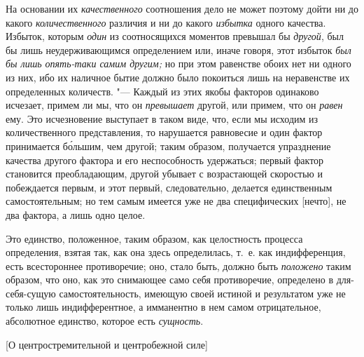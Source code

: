 На основании их {\em качественного} соотношения дело не может поэтому дойти ни
до какого {\em количественного} различия и ни до какого {\em избытка} одного
качества. Избыток, которым {\em один} из соотносящихся моментов превышал бы
{\em другой}, был бы лишь неудерживающимся определением или, иначе говоря, этот
избыток {\em был бы лишь опять-таки самим другим;} но при этом равенстве обоих
нет ни одного из них, ибо их наличное бытие должно было покоиться лишь на
неравенстве их определенных количеств. "--- Каждый из этих якобы факторов
одинаково исчезает, примем ли мы, что он {\em превышает} другой, или примем,
что он {\em равен} ему. Это исчезновение выступает в таком виде, что, если мы
исходим из количественного представления, то нарушается равновесие и один
фактор принимается б\'{о}льшим, чем другой; таким образом, получается
упразднение качества другого фактора и его неспособность удержаться; первый
фактор становится преобладающим, другой убывает с возрастающей скоростью и
побеждается первым, и этот первый, следовательно, делается единственным
самостоятельным; но тем самым имеется уже не два специфических [нечто], не два
фактора, а лишь одно целое.

Это единство, положенное, таким образом, как целостность процесса определения,
взятая так, как она здесь определилась, т.~е. как индифференция, есть
всестороннее противоречие; оно, стало быть, должно быть {\em положено} таким
образом, что оно, как это снимающее само себя противоречие, определено в
для-себя-сущую самостоятельность, имеющую своей истиной и результатом уже не
только лишь индифферентное, а имманентно в нем самом отрицательное, абсолютное
единство, которое есть {\em сущность}.

%
{[О центростремительной и центробежной силе]}

